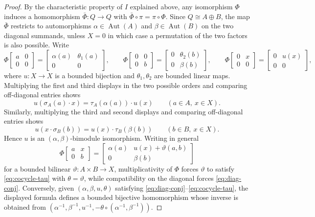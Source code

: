\documentclass{article}
\theoremstyle{plain}
\theoremstyle{definition}
\newcommand{\Aut}{\operatorname{Aut}}
\begin{document}
\begin{proof}
By the characteristic property of \(I\) explained above, any isomorphism \(\Phi\) induces a homomorphism \(\bar\Phi:Q\to Q\) with \(\bar\Phi\circ\pi=\pi\circ\Phi\).
Since \(Q\cong A\oplus B\), the map \(\bar\Phi\) restricts to automorphisms \(\alpha\in\Aut(A)\) and \(\beta\in\Aut(B)\) on the two diagonal summands, unless \(X=0\) in which case a permutation of the two factors is also possible.
Write
\[
\Phi\!\begin{bmatrix}a&0\\[2pt]0&0\end{bmatrix}
=\begin{bmatrix}\alpha(a)&\theta_1(a)\\[2pt]0&0\end{bmatrix},
\qquad
\Phi\!\begin{bmatrix}0&0\\[2pt]0&b\end{bmatrix}
=\begin{bmatrix}0&\theta_2(b)\\[2pt]0&\beta(b)\end{bmatrix},
\qquad
\Phi\!\begin{bmatrix}0&x\\[2pt]0&0\end{bmatrix}
=\begin{bmatrix}0&u(x)\\[2pt]0&0\end{bmatrix},
\]
where \(u:X\to X\) is a bounded bijection and \(\theta_1,\theta_2\) are bounded linear maps.
Multiplying the first and third displays in the two possible orders and comparing off-diagonal entries shows
\[
u(\sigma_A(a)\cdot x)=\tau_A(\alpha(a))\cdot u(x)\qquad(a\in A,\ x\in X).
\]
Similarly, multiplying the third and second displays and comparing off-diagonal entries shows
\[
u(x\cdot \sigma_B(b))=u(x)\cdot \tau_B(\beta(b))\qquad(b\in B,\ x\in X).
\]
Hence \(u\) is an \((\alpha,\beta)\)-bimodule isomorphism.
Writing in general
\[
\Phi\!\begin{bmatrix}a&x\\[2pt]0&b\end{bmatrix}
=\begin{bmatrix}\alpha(a)&u(x)+\vartheta(a,b)\\[2pt]0&\beta(b)\end{bmatrix}
\]
for a bounded bilinear \(\vartheta:A\times B\to X\), multiplicativity of \(\Phi\) forces \(\vartheta\) to satisfy \eqref{eq:cocycle-tau} with \(\theta=\vartheta\), while compatibility on the diagonal forces \eqref{eq:diag-conj}.
Conversely, given \((\alpha,\beta,u,\theta)\) satisfying \eqref{eq:diag-conj}--\eqref{eq:cocycle-tau}, the displayed formula defines a bounded bijective homomorphism whose inverse is obtained from \((\alpha^{-1},\beta^{-1},u^{-1},-\theta\circ(\alpha^{-1},\beta^{-1}))\).
\end{proof}
\end{document}
